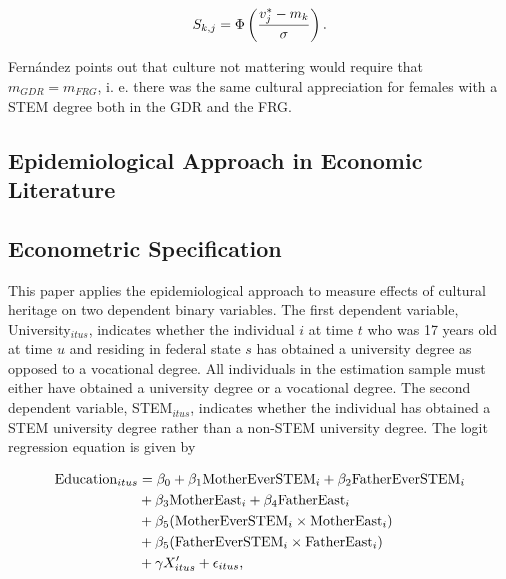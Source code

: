\documentclass[a4paper, oneside, hyperfootnotes = false]{article}
\begin{document}
{\vspace{-8mm}

\begin{equation}
	\label{eq:sharecdfancestry}
	S_{k,j} = \Phi\left(\frac{v^{*}_{j} - m_{k}}{\sigma}\right)\textnormal{.}
\end{equation}

Fernández points out that culture not mattering would require that $m_{GDR} = m_{FRG}$, i. e. there was the same cultural appreciation for females with a STEM degree both in the GDR and the FRG.

\subsection{Epidemiological Approach in Economic Literature}
\label{epidliterature}

\subsection{Econometric Specification}
\label{specification}

This paper applies the epidemiological approach to measure effects of cultural heritage on two dependent binary variables.
The first dependent variable, University$_{itus}$, indicates whether the individual $i$ at time $t$ who was 17 years old at time $u$ and residing in federal state $s$ has obtained a university degree as opposed to a vocational degree.
All individuals in the estimation sample must either have obtained a university degree or a vocational degree.
The second dependent variable, STEM$_{itus}$, indicates whether the individual has obtained a STEM university degree rather than a non-STEM university degree.
The logit regression equation is given by

\vspace{-8mm}

\begin{equation}
	\begin{split}
		\label{eq:specification}
		\textnormal{Education}_{itus} &={} \beta_{0} + \beta_{1}\textnormal{MotherEverSTEM}_{i} + \beta_{2}\textnormal{FatherEverSTEM}_{i} \\
		& + \beta_{3}\textnormal{MotherEast}_{i} + \beta_{4}\textnormal{FatherEast}_{i} \\
		& + \beta_{5}(\textnormal{MotherEverSTEM}_{i} \times \textnormal{MotherEast}_{i}) \\
		& + \beta_{5}(\textnormal{FatherEverSTEM}_{i} \times \textnormal{FatherEast}_{i}) \\
		& + \gamma{}X'_{itus} + \epsilon_{itus}\textnormal{,}
	\end{split}
\end{equation}

}
\end{document}
